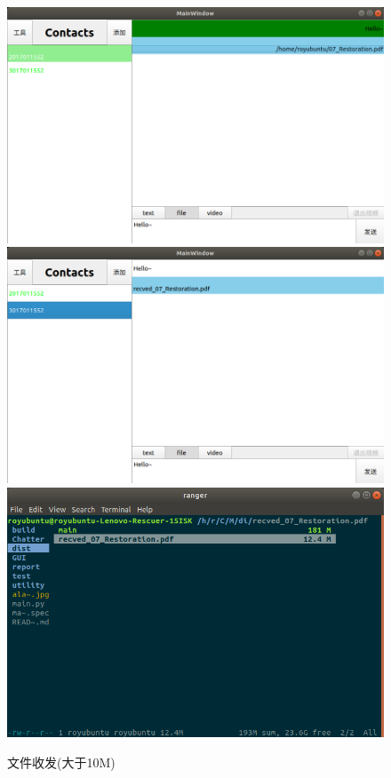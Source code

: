 \documentclass[UTF8]{ctexart}
\begin{document}
\begin{figure}[H]
    \centering
    \includegraphics[scale=0.18]{sendfile.png}
    \includegraphics[scale=0.18]{recvfile.png}
    \includegraphics[scale=0.3]{recvlargefile.png}
    \caption{文件收发(大于10M)}
\end{figure}
\end{document}
